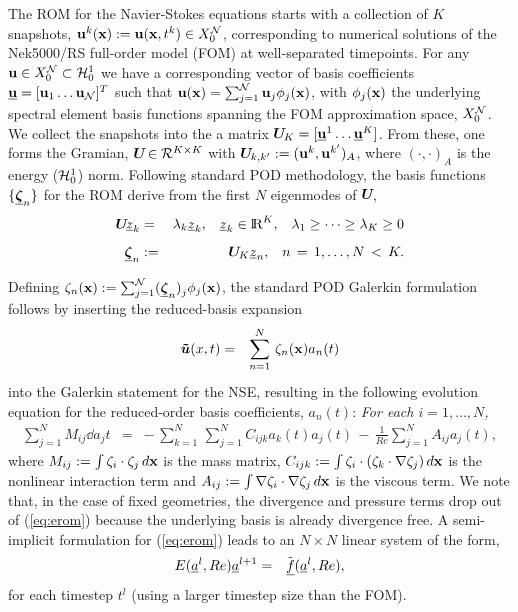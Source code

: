 The ROM for the Navier-Stokes equations starts with a collection of $K$
snapshots, $\mathbf{u}^k(\mathbf{x}) := \mathbf{u}(\mathbf{x},t^k) \in X_0^{{\cal N}}$, corresponding to
numerical solutions of the Nek5000/RS full-order model (FOM) at well-separated
timepoints.  For any $\mathbf{u} \in X_0^{{\cal N}} \subset {\cal H}^1_0$ we have a
corresponding vector of basis coefficients $\mathbf{\underline u}=[\mathbf{u}_1\dots \mathbf{u}_{{\cal N}}]^T$ such
that $\mathbf{u}(\mathbf{x})=\sum_{j=1}^{\cal N} \mathbf{u}_j \phi_j(\mathbf{x})$, with $\phi_j(\mathbf{x})$ the
underlying spectral element basis functions spanning the FOM approximation
space, $X_0^{\cal N}$.  We collect the snapshots into the a matrix ${\mbox{\boldmath $ U $}}\!_K = [ \mathbf{\underline u}^1
\dots \mathbf{\underline u}^K ]$.  From these, one forms the Gramian, ${\mbox{\boldmath $ U $}}\! \in {\cal R}^{K \times K}$
with ${\mbox{\boldmath $ U $}}\!_{k,k'} := (\mathbf{u}^k,\mathbf{u}^{k'})_A$, where $(\cdot,\cdot)_A$ is the energy
(${\cal H}_0^1$) norm.  Following standard POD methodology, the basis functions $\{
\mbox{\boldmath $ \underline \zeta $}_n \}$ for the ROM derive from the first $N$ eigenmodes of ${\mbox{\boldmath $ U $}}\!$,
\\[-3.3ex]
\begin{eqnarray} \label{eq:eig}
\bU\uz_k&=&\lambda_k \uz_k,\;\;\;\uz_k \in \RR^K, \;\;\; \lambda_1 
        \ge \cdots \ge \lambda_K \ge 0
                    \\[1.2ex] \label{eq:podbasis}
\uzeta_n &:=& \bU_K \uz_n, \;\;\; n\,=\,1,\dots,N \, < \, K.
\end{eqnarray}

Defining $\mathbf{\zeta}_n(\mathbf{x}) := \sum_{j=1}^{{\cal N}} (\mbox{\boldmath $ \underline \zeta $}_n)^{}_j \phi_j(\mathbf{x})$, 
the standard POD Galerkin formulation follows by inserting the reduced-basis
expansion
\\[-6.5ex]
\begin{eqnarray} \nonumber
{\mbox{\boldmath $ \tilde u $}}(x,t) &=& \sum_{n=1}^N \, \mathbf{\zeta}_n(\mathbf{x}) a_n(t)  \\[-3.3ex] \nonumber
\end{eqnarray}
into the Galerkin statement for the NSE, resulting in the following
evolution equation for the reduced-order basis coefficients, $a_n(t)$:
{\em For each $i=1,\dots,N$,} \\[-3.3ex]
\begin{eqnarray} \label{eq:erom}
\sum_{j=1}^N M_{ij} \dd{a_j}{t} &=&
- \, \sum_{k=1}^N \, \sum_{j=1}^N C_{ijk} a_k(t) a_j(t) 
\,-\, \frac{1}{Re} \sum_{j=1}^N A_{ij} a_j(t),
\end{eqnarray}
where 
$M_{ij} := \int \mathbf{\zeta}_i \cdot \mathbf{\zeta}_j  \, d\mathbf{x}$ is the mass matrix,
$C_{ijk} := \int \mathbf{\zeta}_i \cdot ( \mathbf{\zeta}_k \cdot \nabla \mathbf{\zeta}_j) \, d\mathbf{x}$
is the nonlinear interaction term and 
$A_{ij} := \int \nabla \mathbf{\zeta}_i \cdot \nabla \mathbf{\zeta}_j \, d\mathbf{x}$
is the viscous term.  We note that, in the case of fixed geometries, 
the divergence and pressure terms drop out of (\ref{eq:erom}) because
the underlying basis is already divergence free.
   A semi-implicit formulation for (\ref{eq:erom}) leads to an $N \times N$
linear system of the form,
\begin{eqnarray} \label{eq:eromd}
E({\underline a}^l,Re) {\underline a}^{l+1} &=& {\tilde {\underline f}} ({\underline a}^l,Re),
\end{eqnarray}
for each timestep $t^l$ (using a larger timestep size than the FOM).

